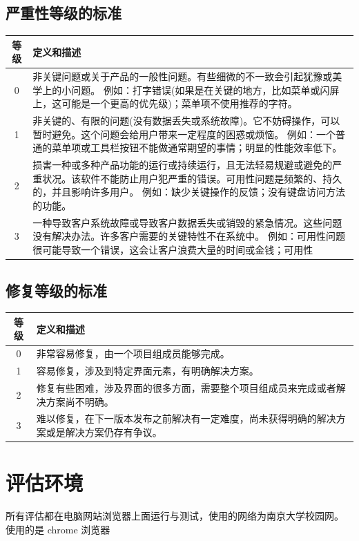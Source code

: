 \documentclass[a4paper,12pt]{article}
\begin{document}
\subsection{严重性等级的标准}
\begin{tabular}{|c|p{10cm}|}
    \hline
    等级 & 定义和描述 \\
    \hline
    0 & 非关键问题或关于产品的一般性问题。有些细微的不一致会引起犹豫或美学上的小问题。 例如：打字错误(如果是在关键的地方，比如菜单或闪屏上，这可能是一个更高的优先级)；菜单项不使用推荐的字符。 \\
    \hline
    1 & 非关键的、有限的问题(没有数据丢失或系统故障)。它不妨碍操作，可以暂时避免。这个问题会给用户带来一定程度的困惑或烦恼。 例如：一个普通的菜单项或工具栏按钮不能做通常期望的事情；明显的性能效率低下。 \\
    \hline
    2 & 损害一种或多种产品功能的运行或持续运行，且无法轻易规避或避免的严重状况。该软件不能防止用户犯严重的错误。可用性问题是频繁的、持久的，并且影响许多用户。 例如：缺少关键操作的反馈；没有键盘访问方法的功能。 \\
    \hline
    3 & 一种导致客户系统故障或导致客户数据丢失或销毁的紧急情况。这些问题没有解决办法。许多客户需要的关键特性不在系统中。 例如：可用性问题很可能导致一个错误，这会让客户浪费大量的时间或金钱；可用性 \\
    \hline
\end{tabular}

\subsection{修复等级的标准}
\begin{tabular}{|c|p{10cm}|}
    \hline
    等级 & 定义和描述 \\
    \hline
    0 & 非常容易修复，由一个项目组成员能够完成。 \\
    \hline
    1 & 容易修复，涉及到特定界面元素，有明确解决方案。 \\
    \hline
    2 & 修复有些困难，涉及界面的很多方面，需要整个项目组成员来完成或者解决方案尚不明确。 \\
    \hline
    3 & 难以修复，在下一版本发布之前解决有一定难度，尚未获得明确的解决方案或是解决方案仍存有争议。 \\
    \hline
    \end{tabular}
    
\section{评估环境}
所有评估都在电脑网站浏览器上面运行与测试，使用的网络为南京大学校园网。
使用的是 chrome 浏览器
\end{document}
